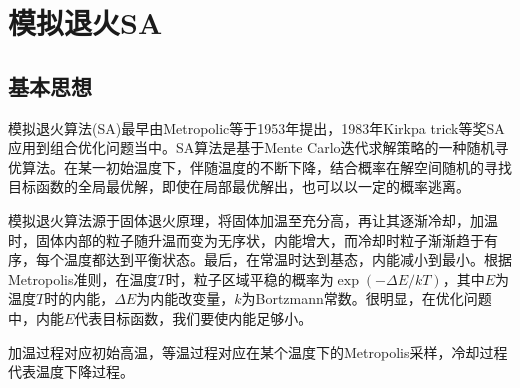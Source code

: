 \section{模拟退火SA}
    \subsection{基本思想}
        \par
        模拟退火算法(SA)最早由Metropolic等于1953年提出，1983年Kirkpa trick等奖SA应用到组合优化问题当中。SA算法是基于Mente Carlo迭代求解策略的一种随机寻优算法。在某一初始温度下，伴随温度的不断下降，结合概率在解空间随机的寻找目标函数的全局最优解，即使在局部最优解出，也可以以一定的概率逃离。
        \par
        模拟退火算法源于固体退火原理，将固体加温至充分高，再让其逐渐冷却，加温时，固体内部的粒子随升温而变为无序状，内能增大，而冷却时粒子渐渐趋于有序，每个温度都达到平衡状态。最后，在常温时达到基态，内能减小到最小。根据Metropolis准则，在温度$T$时，粒子区域平稳的概率为$\exp(-\Delta E/kT)$，其中$E$为温度$T$时的内能，$\Delta E$为内能改变量，$k$为Bortzmann常数。很明显，在优化问题中，内能$E$代表目标函数，我们要使内能足够小。
        \par
        加温过程对应初始高温，等温过程对应在某个温度下的Metropolis采样，冷却过程代表温度下降过程。
